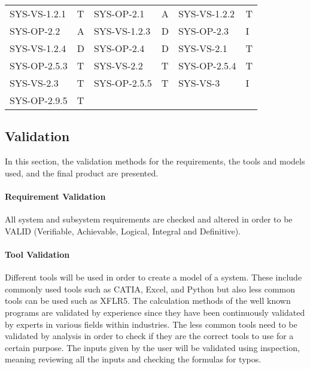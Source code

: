 \begin{table}[htb]
\begin{tabular}{ll :ll:ll}
SYS-VS-1.2.1            &T                          &SYS-OP-2.1              &A                       &SYS-VS-1.2.2            &T          \\\hdashline
SYS-OP-2.2              &A                       &SYS-VS-1.2.3            &D &SYS-OP-2.3              &I  \\\hdashline     
SYS-VS-1.2.4            &D                       &SYS-OP-2.4              &D                       &SYS-VS-2.1              &T          \\\hdashline
SYS-OP-2.5.3            &T                       &SYS-VS-2.2              &T          &SYS-OP-2.5.4            &T         \\\hdashline              
SYS-VS-2.3              &T          &SYS-OP-2.5.5            &T                       &SYS-VS-3                &I    \\\hdashline
SYS-OP-2.9.5 & T &&&&    \\
\bottomrule
\end{tabular}
\end{table}



\subsection{Validation}
\label{sec:validation}

In this section, the validation methods for the requirements, the tools and models used, and the final product are presented. 

\paragraph{Requirement Validation}
All system and subsystem requirements are checked and altered in order to be VALID (Verifiable, Achievable, Logical, Integral and Definitive).

\paragraph{Tool Validation}
Different tools will be used in order to create a model of a system. These include commonly used tools such as CATIA, Excel, and Python but also less common tools can be used such as XFLR5. The calculation methods of the well known programs are validated by experience since they have been continuously validated by experts in various fields within industries. The less common tools need to be validated by analysis in order to check if they are the correct tools to use for a certain purpose. The inputs given by the user will be validated using inspection, meaning reviewing all the inputs and checking the formulas for typos.

